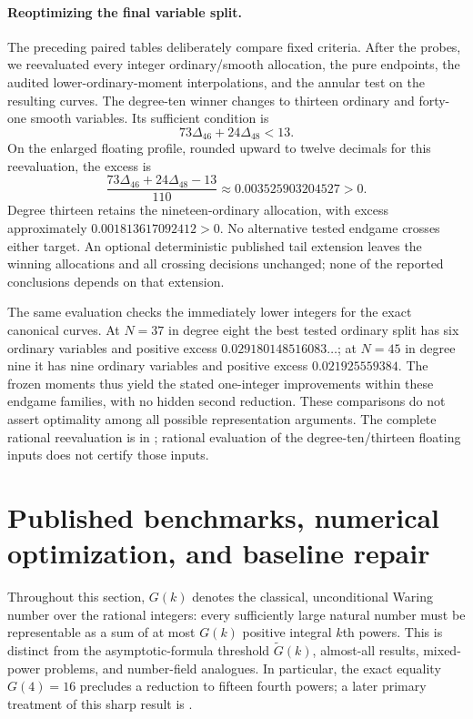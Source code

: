 \documentclass[11pt,letterpaper]{article}
\numberwithin{equation}{section}
\begin{document}
\paragraph{Reoptimizing the final variable split.}
The preceding paired tables deliberately compare fixed criteria. After the
probes, we reevaluated every integer ordinary/smooth allocation, the pure
endpoints, the audited lower-ordinary-moment interpolations, and the annular
test on the resulting curves. The degree-ten winner changes to thirteen
ordinary and forty-one smooth variables. Its sufficient condition is
\[
                   73\Delta_{46}+24\Delta_{48}<13.
\]
On the enlarged floating profile, rounded upward to twelve decimals for this
reevaluation, the excess is
\[
 \frac{73\Delta_{46}+24\Delta_{48}-13}{110}
       \approx0.003525903204527>0.
\]
Degree thirteen retains the nineteen-ordinary allocation, with excess
approximately $0.001813617092412>0$. No alternative tested endgame crosses
either target. An optional deterministic published tail extension leaves
the winning allocations and all crossing decisions unchanged; none of the
reported conclusions depends on that extension.

The same evaluation checks the immediately lower integers for the exact
canonical curves. At $N=37$ in degree eight the best tested ordinary split
has six ordinary variables and positive excess
$0.029180148516083\ldots$; at $N=45$ in degree nine it has nine ordinary
variables and positive excess $0.021925559384$. The frozen moments thus
yield the stated one-integer improvements within these endgame families,
with no hidden second reduction. These comparisons do not assert optimality
among all possible representation arguments. The complete rational
reevaluation is in ; rational evaluation
of the degree-ten/thirteen floating inputs does not certify those inputs.

\par\bigskip{}

\section{Published benchmarks, numerical optimization, and baseline repair}
\label{sec:literature-baseline}

Throughout this section, $G(k)$ denotes the classical, unconditional Waring
number over the rational integers: every sufficiently large natural number
must be representable as a sum of at most $G(k)$ positive integral $k$th
powers. This is distinct from the asymptotic-formula threshold
$\widetilde G(k)$, almost-all results, mixed-power problems, and number-field
analogues. In particular, the exact equality $G(4)=16$ precludes a reduction
to fifteen fourth powers; a later primary treatment of this sharp result
is \cite{DKW05}.
\end{document}
